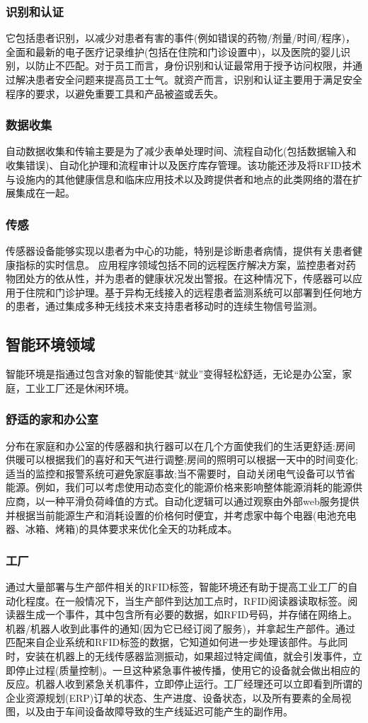 \documentclass[12pt,a4paper]{article}%
\begin{document}
\subsubsection{识别和认证}
它包括患者识别，以减少对患者有害的事件(例如错误的药物/剂量/时间/程序)，全面和最新的电子医疗记录维护(包括在住院和门诊设置中)，以及医院的婴儿识别，以防止不匹配。对于员工而言，身份识别和认证最常用于授予访问权限，并通过解决患者安全问题来提高员工士气。就资产而言，识别和认证主要用于满足安全程序的要求，以避免重要工具和产品被盗或丢失。
\subsubsection{数据收集}
自动数据收集和传输主要是为了减少表单处理时间、流程自动化(包括数据输入和收集错误)、自动化护理和流程审计以及医疗库存管理。该功能还涉及将RFID技术与设施内的其他健康信息和临床应用技术以及跨提供者和地点的此类网络的潜在扩展集成在一起。
\subsubsection{传感}
传感器设备能够实现以患者为中心的功能，特别是诊断患者病情，提供有关患者健康指标的实时信息。
应用程序领域包括不同的远程医疗解决方案，监控患者对药物团处方的依从性，并为患者的健康状况发出警报。在这种情况下，传感器可以应用于住院和门诊护理。基于异构无线接入的远程患者监测系统可以部署到任何地方的患者，通过集成多种无线技术来支持患者移动时的连续生物信号监测。
\subsection{智能环境领域}
智能环境是指通过包含对象的智能使其“就业”变得轻松舒适，无论是办公室，家庭，工业工厂还是休闲环境。
\subsubsection{舒适的家和办公室}
分布在家庭和办公室的传感器和执行器可以在几个方面使我们的生活更舒适:房间供暖可以根据我们的喜好和天气进行调整;房间的照明可以根据一天中的时间变化;适当的监控和报警系统可避免家庭事故;当不需要时，自动关闭电气设备可以节省能源。例如，我们可以考虑使用动态变化的能源价格来影响整体能源消耗的能源供应商，以一种平滑负荷峰值的方式。自动化逻辑可以通过观察由外部web服务提供并根据当前能源生产和消耗设置的价格何时便宜，并考虑家中每个电器(电池充电器、冰箱、烤箱)的具体要求来优化全天的功耗成本。
\subsubsection{工厂}
通过大量部署与生产部件相关的RFID标签，智能环境还有助于提高工业工厂的自动化程度。在一般情况下，当生产部件到达加工点时，RFID阅读器读取标签。阅读器生成一个事件，其中包含所有必要的数据，如RFID号码，并存储在网络上。机器/机器人收到此事件的通知(因为它已经订阅了服务)，并拿起生产部件。通过匹配来自企业系统和RFID标签的数据，它知道如何进一步处理该部件。与此同时，安装在机器上的无线传感器监测振动，如果超过特定阈值，就会引发事件，立即停止过程(质量控制)。一旦这种紧急事件被传播，使用它的设备就会做出相应的反应。机器人收到紧急关机事件，立即停止运行。工厂经理还可以立即看到所谓的企业资源规划(ERP)订单的状态、生产进度、设备状态，以及所有要素的全局视图，以及由于车间设备故障导致的生产线延迟可能产生的副作用。
\end{document}

